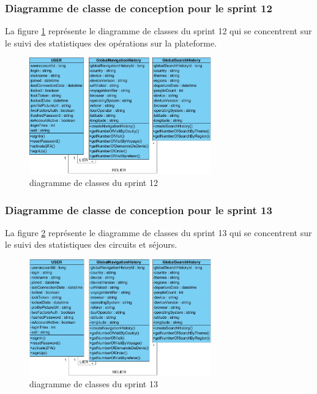 \documentclass[12pt]{report}
\begin{document}
			\subsubsection{Diagramme de classe de conception pour le sprint 12}
				
			\hspace{15pt} La figure \ref{fig:sprint12} représente le diagramme de classes du sprint 12 qui se concentrent sur le suivi des statistiques des opérations sur la plateforme.


			\begin{figure}[h]
				\centering
				\includegraphics[width=0.7\textwidth]{sprint12.jpg}
				\caption{diagramme de classes du sprint 12}
				\label{fig:sprint12}
			\end{figure}
			\FloatBarrier

			\subsubsection{Diagramme de classe de conception pour le sprint 13}
				
			\hspace{15pt} La figure \ref{fig:sprint13} représente le diagramme de classes du sprint 13 qui se concentrent sur le suivi des statistiques des circuits et séjours.


			\begin{figure}[h]
				\centering
				\includegraphics[width=0.7\textwidth]{sprint13.jpg}
				\caption{diagramme de classes du sprint 13}
				\label{fig:sprint13}
			\end{figure}
			\FloatBarrier
\end{document}
